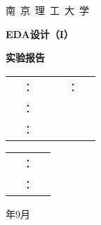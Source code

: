 \documentclass{report}
\numberwithin{Exercise}{chapter}
\numberwithin{Answer}{chapter}
\begin{document}

\begin{titlepage}
	\centering

	\begin{spacing}{1.5}
		\vfill
	\end{spacing}

	\begin{spacing}{1.5}
		\fontsize{30pt}{30pt}\selectfont\kaishu
		\vspace{0.5em}

		南~京~理~工~大~学

		\vspace{0.2em}
	\end{spacing}

	\begin{spacing}{1.5}
		\fontsize{45pt}{45pt}\selectfont
		\textbf{EDA设计（I）}

		\textbf{实验报告}
	\end{spacing}

	\begin{spacing}{1}
		\vspace{3em}
	\end{spacing}

	\begin{spacing}{2}
		\fontsize{16pt}{16pt}\selectfont
		\begin{tabu}to.8
			      & ：&\underline{} &       & ：&\underline{}\\
			      & ：&\\
			      & ：&
		\end{tabu}

		\vspace{1em}

		\begin{tabu}to.6
			  & ：&\underline{}\\
			  & ：&\underline{}
		\end{tabu}

		\vspace{1em}
	\end{spacing}

	\begin{spacing}{2}
		\fontsize{18pt}{18pt}\selectfont\heiti
		\number\year 年9月
	\end{spacing}

\end{titlepage}
\end{document}
